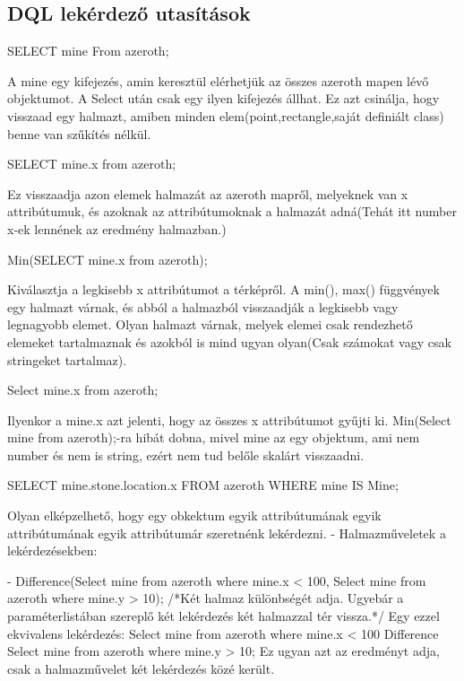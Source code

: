 \begin{sql}
\section{DQL lekérdező utasítások}

\begin{sql}
SELECT mine From azeroth;
\end{sql}
A mine egy kifejezés, amin keresztül elérhetjük az összes  azeroth mapen lévő objektumot. A Select után csak egy ilyen kifejezés állhat. Ez azt csinálja, hogy visszaad egy halmazt, amiben minden elem(point,rectangle,saját definiált class) benne van szűkítés nélkül.
\begin{sql}
SELECT mine.x from azeroth;
\end{sql}
Ez visszaadja azon elemek halmazát az azeroth mapről, melyeknek van x attribútumuk, és azoknak az attribútumoknak a halmazát adná(Tehát itt number x-ek lennének az eredmény halmazban.)


\begin{sql}
Min(SELECT mine.x from azeroth);
\end{sql}
Kiválasztja a legkisebb x attribútumot a térképről.
A min(), max() függvények egy halmazt várnak, és abból a halmazból visszaadják a legkisebb vagy legnagyobb elemet. Olyan halmazt várnak, melyek elemei csak rendezhető elemeket tartalmaznak és azokból is mind ugyan olyan(Csak számokat vagy csak stringeket tartalmaz).
\begin{sql}
Select mine.x from azeroth;
\end{sql}
Ilyenkor a mine.x  azt jelenti, hogy az összes x attribútumot gyűjti ki.
Min(Select mine from azeroth);-ra hibát dobna, mivel mine az egy objektum, ami nem number és nem is string, ezért nem tud belőle skalárt visszaadni.

\begin{sql}
SELECT mine.stone.location.x FROM azeroth WHERE mine IS Mine;
\end{sql}
Olyan elképzelhető, hogy egy obkektum egyik attribútumának egyik attribútumának egyik attribútumár szeretnénk lekérdezni.
- Halmazműveletek a lekérdezésekben:

- Difference(Select mine from azeroth where mine.x < 100, Select mine from azeroth where mine.y > 10);  /*Két halmaz különbségét adja. Ugyebár a paraméterlistában szereplő két lekérdezés két halmazzal tér vissza.*/
Egy ezzel ekvivalens lekérdezés:
Select mine from azeroth where mine.x < 100 Difference Select mine from azeroth where mine.y > 10;   Ez ugyan azt az eredményt adja, csak a halmazművelet két lekérdezés közé került.


\end{sql}
